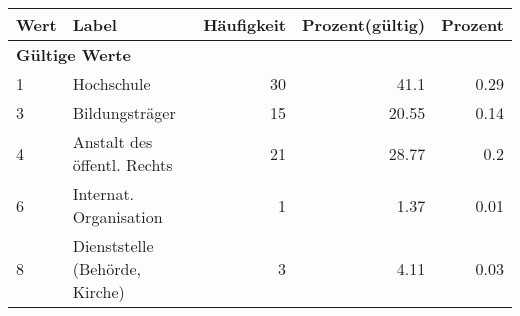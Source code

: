      \begin{longtable}{lXrrr}
     \toprule
     \textbf{Wert} & \textbf{Label} & \textbf{Häufigkeit} & \textbf{Prozent(gültig)} & \textbf{Prozent} \\
     \endhead
     \midrule
     \multicolumn{5}{l}{\textbf{Gültige Werte}}\\

     1 &
     \multicolumn{1}{X}{ Hochschule   } &


       \num{30} &
       \num[round-mode=places,round-precision=2]{41,1} &
         \num[round-mode=places,round-precision=2]{0,29} \\

     3 &
     \multicolumn{1}{X}{ Bildungsträger   } &


       \num{15} &
       \num[round-mode=places,round-precision=2]{20,55} &
         \num[round-mode=places,round-precision=2]{0,14} \\

     4 &
     \multicolumn{1}{X}{ Anstalt des öffentl. Rechts   } &


       \num{21} &
       \num[round-mode=places,round-precision=2]{28,77} &
         \num[round-mode=places,round-precision=2]{0,2} \\

     6 &
     \multicolumn{1}{X}{ Internat. Organisation   } &


       \num{1} &
       \num[round-mode=places,round-precision=2]{1,37} &
         \num[round-mode=places,round-precision=2]{0,01} \\

     8 &
     \multicolumn{1}{X}{ Dienststelle (Behörde, Kirche)   } &


       \num{3} &
       \num[round-mode=places,round-precision=2]{4,11} &
         \num[round-mode=places,round-precision=2]{0,03} \\


\end{longtable}
